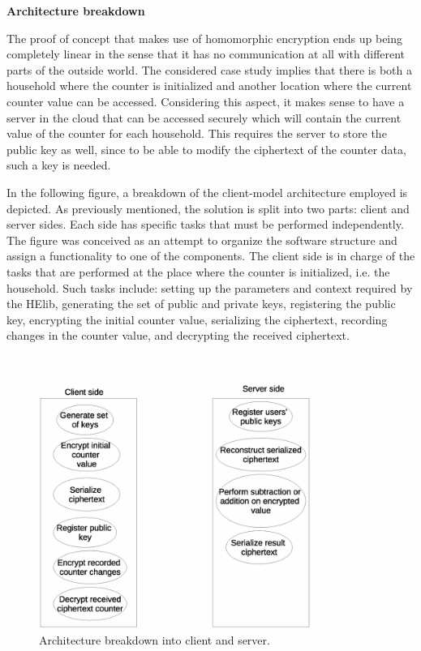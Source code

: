 \textbf{Architecture breakdown}

The proof of concept that makes use of homomorphic encryption ends up being completely linear in the sense that it has no communication at all with different parts of the outside world. The considered case study implies that there is both a household where the counter is initialized and another location where the current counter value can be accessed. Considering this aspect, it makes sense to have a server in the cloud that can be accessed securely which will contain the current value of the counter for each household. This requires the server to store the public key as well, since to be able to modify the ciphertext of the counter data, such a key is needed. 

In the following figure, a breakdown of the client-model architecture employed is depicted. As previously mentioned, the solution is split into two parts: client and server sides. Each side has specific tasks that must be performed independently. The figure was conceived as an attempt to organize the software structure and assign a functionality to one of the components. The client side is in charge of the tasks that are performed at the place where the counter is initialized, i.e. the household. Such tasks include: setting up the parameters and context required by the HElib, generating the set of public and private keys, registering the public key, encrypting the initial counter value, serializing the ciphertext, recording changes in the counter value, and decrypting the received ciphertext. 

\begin{figure}[h!]
  \centering 
  \includegraphics[scale=0.7]{clientserver}
  \caption{Architecture breakdown into client and server.}
\end{figure}

